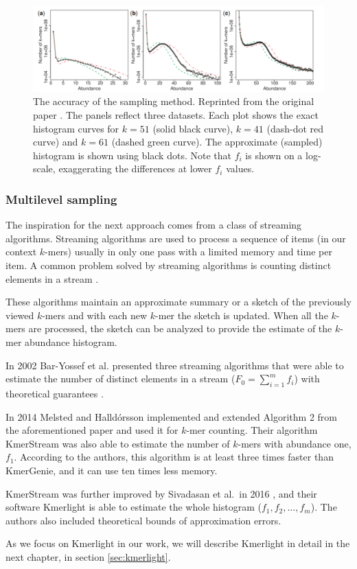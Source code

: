 \begin{figure}
\centerline{\includegraphics[width=1.1\textwidth]{images/kmergenie-sampling-accuracy.pdf}}
\caption[Accuracy of KmerGenie Sampling]{The accuracy of the sampling method. 
Reprinted from the original paper \cite{Chikhi2013}. 
The panels reflect three datasets. Each plot shows the exact
histogram curves for $k=51$ (solid black curve), $k=41$ (dash-dot red curve) 
and $k=61$ (dashed green curve). The approximate (sampled) histogram is
shown using black dots. Note that $f_i$ is shown on a log-scale, 
exaggerating the differences at lower $f_i$ values.}
\label{img:kmergenie-sampling-accuracy}
\end{figure}

\subsubsection{Multilevel sampling}
The inspiration for the next approach comes from a class of streaming algorithms.
Streaming algorithms are used to process a sequence of items (in our context $k$-mers) usually 
in only one pass with a limited memory and time per item. A common problem solved by
streaming algorithms is counting distinct elements in a stream \cite{WikiStreamingAlg}.

These algorithms maintain an approximate summary or a sketch of the previously viewed
$k$-mers and with each new $k$-mer the sketch is updated. When all the $k$-mers are processed,
the sketch can be analyzed to provide the estimate of the $k$-mer abundance histogram.

\medskip

In 2002 Bar-Yossef et al. presented three streaming algorithms that were
able to estimate the number of distinct elements in a stream ($F_0 = \sum_{i=1}^{m} f_i$)
with theoretical guarantees \cite{Bar-Yossef2002}. 

In 2014 Melsted and Halldórsson \cite{Melsted2014} implemented and extended Algorithm 2 
from the aforementioned paper \cite{Bar-Yossef2002} and used it for $k$-mer counting. Their
algorithm KmerStream was also able to estimate the number of $k$-mers with abundance one, 
$f_1$. According to the authors, this algorithm is at least three times faster than KmerGenie, 
and it can use ten times less memory.

KmerStream was further improved by Sivadasan et al.\ in 2016 \cite{Sivadasan2016},
and their software Kmerlight is able to estimate the whole histogram ($f_1, f_2, \dots , f_m$).
The authors also included theoretical bounds of approximation errors.

As we focus on Kmerlight in our work, we will describe Kmerlight in detail 
in the next chapter, in section \ref{sec:kmerlight}.
